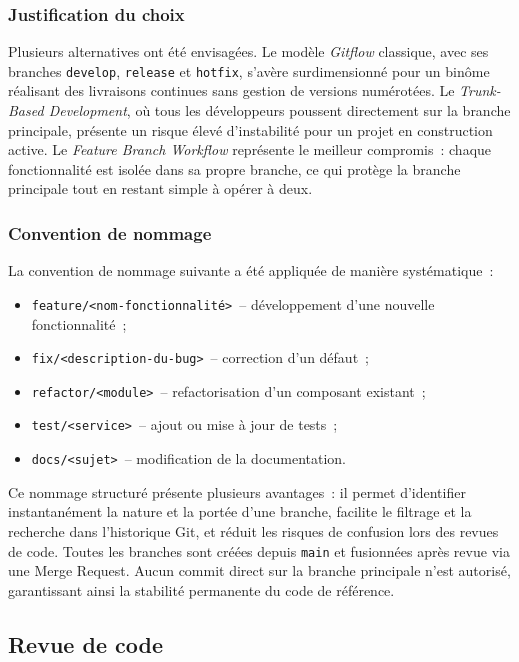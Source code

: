 \subsubsection*{Justification du choix}

Plusieurs alternatives ont été envisagées. Le modèle \textit{Gitflow} classique, avec ses branches
\texttt{develop}, \texttt{release} et \texttt{hotfix}, s'avère surdimensionné pour un binôme
réalisant des livraisons continues sans gestion de versions numérotées. Le \textit{Trunk-Based
Development}, où tous les développeurs poussent directement sur la branche principale, présente un
risque élevé d'instabilité pour un projet en construction active. Le \textit{Feature Branch
Workflow} représente le meilleur compromis~: chaque fonctionnalité est isolée dans sa propre
branche, ce qui protège la branche principale tout en restant simple à opérer à deux.

\subsubsection*{Convention de nommage}

La convention de nommage suivante a été appliquée de manière systématique~:

\begin{itemize}
    \item \texttt{feature/<nom-fonctionnalité>}~-- développement d'une nouvelle fonctionnalité~;
    \item \texttt{fix/<description-du-bug>}~-- correction d'un défaut~;
    \item \texttt{refactor/<module>}~-- refactorisation d'un composant existant~;
    \item \texttt{test/<service>}~-- ajout ou mise à jour de tests~;
    \item \texttt{docs/<sujet>}~-- modification de la documentation.
\end{itemize}

Ce nommage structuré présente plusieurs avantages~: il permet d'identifier instantanément la
nature et la portée d'une branche, facilite le filtrage et la recherche dans l'historique Git,
et réduit les risques de confusion lors des revues de code. Toutes les branches sont créées
depuis \texttt{main} et fusionnées après revue via une Merge Request. Aucun commit direct sur
la branche principale n'est autorisé, garantissant ainsi la stabilité permanente du code de
référence.

\subsection{Revue de code}

